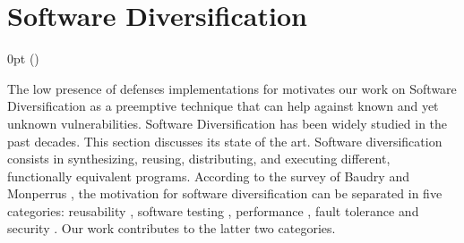 \section{Software Diversification}
\label{sota:sota}
\def\checkmark{\tikz\fill[scale=0.4](0,.35) -- (.25,0) -- (1,.7) -- (.25,.15) -- cycle;} 

  {\topsep}%
  {\topsep}%
  {\itshape}%
  {0pt}%
  {\bfseries}%
  {}%
  { }%
  {()\textnormal{}}

\def\Gnospace~{G{}}
\theoremstyle{sota}
\newtheorem{goal}{G}
\providecommand*{\definitionautorefname}{\Gnospace}
\newcommand{\goalautorefname}{\Gnospace}


\def\Snospace~{S{}}
\theoremstyle{sota}
\newtheorem{strategy}{S}
\providecommand*{\definitionautorefname}{\Snospace}
\newcommand{\strategyautorefname}{\Snospace}

\def\Unospace~{U{}}
\theoremstyle{sota}
\newtheorem{usage}{U}
\providecommand*{\definitionautorefname}{\Unospace}
\newcommand{\usageautorefname}{\Unospace}









The low presence of defenses implementations for \wasm motivates our work on Software Diversification as a preemptive technique that can help against known and yet unknown vulnerabilities.
Software Diversification has been widely studied in the past decades. This section discusses its state of the art.
Software diversification consists in synthesizing, reusing, distributing, and executing different, functionally equivalent programs. 
According to the survey of Baudry and Monperrus \cite{natural_diversity}, the motivation for software diversification can be separated in five categories: reusability \cite{pohl2005software}, software testing \cite{Chen2010AdaptiveRT}, performance \cite{10.1145/2025113.2025133}, fault tolerance \cite{1659219} and security \cite{cohen1993operating}. Our work contributes to the latter two categories. 

